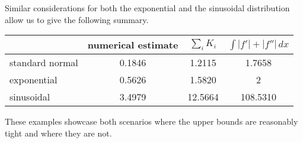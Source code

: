 Similar considerations for both the exponential and the sinusoidal distribution allow us to give the following summary.
\begin{center}
\begin{tabular}{l | c | c | c}
& numerical estimate & $\sum_i K_i$ & $\int |f'| + |f''|\,dx$\\
\hline
standard normal & 0.1846 & 1.2115 & 1.7658\\
exponential & 0.5626 & 1.5820 & 2\\
sinusoidal & 3.4979 & 12.5664 & 108.5310\\
\end{tabular}
\end{center}
These examples showcase both scenarios where the upper bounds are reasonably tight and where they are not.



